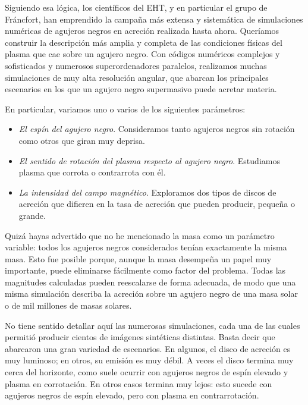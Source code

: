 Siguiendo esa lógica, los científicos del EHT, y en particular el grupo de Fráncfort, han emprendido la campaña más extensa y sistemática de simulaciones numéricas de agujeros negros en acreción realizada hasta ahora. Queríamos construir la descripción más amplia y completa de las condiciones físicas del plasma que cae sobre un agujero negro. Con códigos numéricos complejos y sofisticados y numerosos superordenadores paralelos, realizamos muchas simulaciones de muy alta resolución angular, que abarcan los principales escenarios en los que un agujero negro supermasivo puede acretar materia.

En particular, variamos uno o varios de los siguientes parámetros:

\begin{itemize}
\item \emph{El espín del agujero negro}. Consideramos tanto agujeros negros sin rotación como otros que giran muy deprisa.

\item \emph{El sentido de rotación del plasma respecto al agujero negro}. Estudiamos plasma que corrota o contrarrota con él.

\item \emph{La intensidad del campo magnético}. Exploramos dos tipos de discos de acreción que difieren en la tasa de acreción que pueden producir, pequeña o grande.
\end{itemize}

Quizá hayas advertido que no he mencionado la masa como un parámetro variable: todos los agujeros negros considerados tenían exactamente la misma masa. Esto fue posible porque, aunque la masa desempeña un papel muy importante, puede eliminarse fácilmente como factor del problema. Todas las magnitudes calculadas pueden reescalarse de forma adecuada, de modo que una misma simulación describa la acreción sobre un agujero negro de una masa solar o de mil millones de masas solares.

No tiene sentido detallar aquí las numerosas simulaciones, cada una de las cuales permitió producir cientos de imágenes sintéticas distintas. Basta decir que abarcaron una gran variedad de escenarios. En algunos, el disco de acreción es muy luminoso; en otros, su emisión es muy débil. A veces el disco termina muy cerca del horizonte, como suele ocurrir con agujeros negros de espín elevado y plasma en corrotación. En otros casos termina muy lejos: esto sucede con agujeros negros de espín elevado, pero con plasma en contrarrotación.

